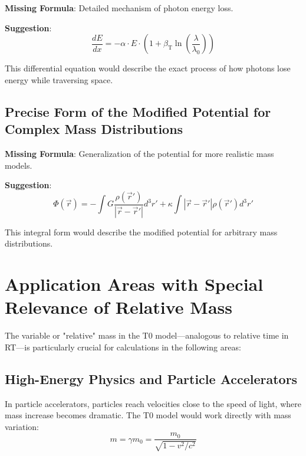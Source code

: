 \documentclass[12pt,a4paper]{article}
\newcommand{\betaT}{\beta_{\text{T}}}
\begin{document}
	\textbf{Missing Formula}: Detailed mechanism of photon energy loss.
	
	\textbf{Suggestion}:
	\begin{equation}
		\frac{dE}{dx} = -\alpha \cdot E \cdot \left(1 + \betaT \ln\left(\frac{\lambda}{\lambda_0}\right)\right)
	\end{equation}
	
	This differential equation would describe the exact process of how photons lose energy while traversing space.
	
	\subsection{Precise Form of the Modified Potential for Complex Mass Distributions}
	\label{subsec:modified_potential}
	
	\textbf{Missing Formula}: Generalization of the potential for more realistic mass models.
	
	\textbf{Suggestion}:
	\begin{equation}
		\Phi(\vec{r}) = -\int G \frac{\rho(\vec{r}')}{|\vec{r}-\vec{r}'|} d^3r' + \kappa\int|\vec{r}-\vec{r}'|\rho(\vec{r}')d^3r'
	\end{equation}
	
	This integral form would describe the modified potential for arbitrary mass distributions.
	
	\section{Application Areas with Special Relevance of Relative Mass}
	\label{sec:relative_mass_applications}
	
	The variable or "relative" mass in the T0 model—analogous to relative time in RT—is particularly crucial for calculations in the following areas:
	
	\subsection{High-Energy Physics and Particle Accelerators}
	\label{subsec:high_energy_physics}
	
	In particle accelerators, particles reach velocities close to the speed of light, where mass increase becomes dramatic. The T0 model would work directly with mass variation:
	\begin{equation}
		m = \gamma m_0 = \frac{m_0}{\sqrt{1-v^2/c^2}}
	\end{equation}
	
\end{document}
